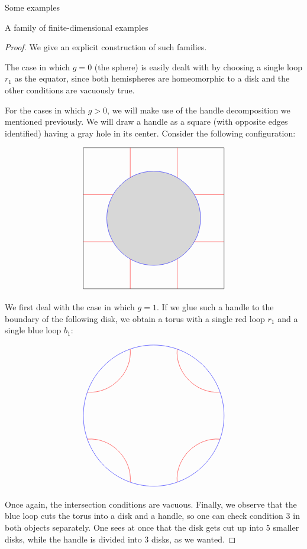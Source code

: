 \begin{chapter}{Some examples}
\begin{section}{A family of finite-dimensional examples}
\begin{proof} We give an explicit construction of such families.

The case in which $g=0$ (the sphere) is easily dealt with by choosing a single loop $r_1$ as the equator, since both hemispheres are homeomorphic to a disk and the other conditions are vacuously true.

For the cases in which $g>0$, we will make use of the handle decomposition we mentioned previously. We will draw a handle as a square (with opposite edges identified) having a gray hole in its center. Consider the following configuration:

\begin{figure}[h]
\[
\begin{tikzpicture}
\draw (0,0) node[minimum size=6cm,draw] {};

\fill [black,opacity=.15] circle (2cm);

\draw[red] (-3,1) -- (-1.73,1);
\draw[red] (-3,-1) -- (-1.73,-1);

\draw[red] (3,1) -- (1.73,1);
\draw[red] (3,-1) -- (1.73,-1);

\draw[red] (1,-3) -- (1,-1.73);
\draw[red] (-1,-3) -- (-1,-1.73);

\draw[red] (1,3) -- (1,1.73);
\draw[red] (-1,3) -- (-1,1.73);

\draw[blue] (0,0) circle (2cm);
\end{tikzpicture}
\]
\end{figure}

We first deal with the case in which $g=1$. If we glue such a handle to the boundary of the following disk, we obtain a torus with a single red loop $r_1$ and a single blue loop $b_1$:

\begin{figure}[h]
\label{divided-handle}
\[
\begin{tikzpicture}

\draw[red] (-2.83,1) to [bend right=50] (-1,2.83);
\draw[red] (2.83,1) to [bend left=50] (1,2.83);
\draw[red] (2.83,-1) to [bend right=50] (1,-2.83);
\draw[red] (-2.83,-1) to [bend left=50] (-1,-2.83);

\draw[blue] (0,0) circle (3cm);
\end{tikzpicture}
\]
\end{figure}

Once again, the intersection conditions are vacuous. Finally, we observe that the blue loop cuts the torus into a disk and a handle, so one can check condition $3$ in both objects separately. One sees at once that the disk gets cut up into 5 smaller disks, while the handle is divided into $3$ disks, as we wanted.


\end{proof}
\end{section}
\end{chapter}
